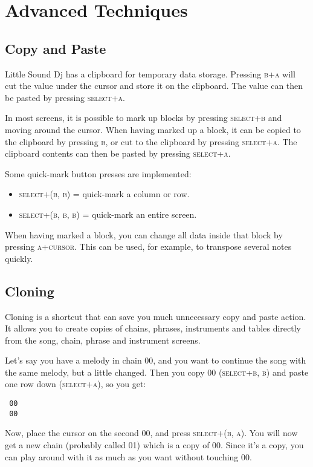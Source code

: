 \chapter{Advanced Techniques}

\section{Copy and Paste} \label{copy-paste}

Little Sound Dj has a clipboard for temporary data storage. Pressing \textsc{b+a} will cut the value
under the cursor and store it on the clipboard. The value can then be pasted by pressing
\textsc{select+a}.

In most screens, it is possible to mark up blocks by pressing \textsc{select+b} and moving around
the cursor. When having marked up a block, it can be copied to the clipboard by pressing \textsc{b},
or cut to the clipboard by pressing \textsc{select+a}. The clipboard contents can then be pasted by
pressing \textsc{select+a}.

Some quick-mark button presses are implemented:
\begin{itemize}
\item \textsc{select+(b, b)} = quick-mark a column or row.
\item \textsc{select+(b, b, b)} = quick-mark an entire screen.
\end{itemize}

When having marked a block, you can change all data inside that block by pressing \textsc{a+cursor}. This can be used, for example, to transpose several notes quickly.

\section{Cloning}

Cloning is a shortcut that can save you much unnecessary copy and paste action. It allows you to create copies of chains, phrases, instruments and tables directly from the song, chain, phrase and instrument screens.

Let's say you have a melody in chain 00, and you want to continue the song with the same melody, but a little changed. Then you copy 00 \textsc{(select+b, b)} and paste one row down \textsc{(select+a)}, so you get:

\begin{verbatim}
 00
 00
\end{verbatim}

Now, place the cursor on the second 00, and press \textsc{select+(b, a)}.
You will now get a new chain (probably called 01) which is a copy of 00. Since it's a copy, you can play around with it as much as you want without touching 00.

